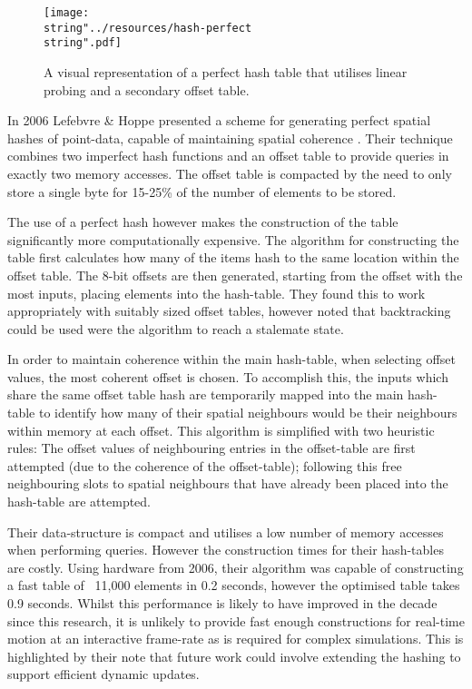 \begin{wrapfigure}{O}{0.6\columnwidth}
  \begin{centering}
    \texttt{[image: \\string"../resources/hash-perfect\\string".pdf]}
  \par\end{centering}
  \protect\caption[A visual representation of a perfect hash table that utilises a secondary offset table.]{\label{fig:hash-perfect}A visual representation of a perfect hash table that utilises linear probing and a secondary offset table.}
\end{wrapfigure}
      In 2006 Lefebvre \& Hoppe presented a scheme for generating perfect spatial hashes of point-data, capable of maintaining spatial \gls{coherence} \cite{LH06}. Their technique combines two imperfect hash functions and an offset table to provide queries in exactly two memory accesses. The offset table is compacted by the need to only store a single byte for 15-25\% of the number of elements to be stored.
      
      The use of a perfect hash however makes the construction of the table significantly more computationally expensive. The algorithm for constructing the table first calculates how many of the items hash to the same location within the offset table. The 8-bit offsets are then generated, starting from the offset with the most inputs, placing elements into the hash-table. They found this to work appropriately with suitably sized offset tables, however noted that backtracking could be used were the algorithm to reach a stalemate state.
      
      In order to maintain \gls{coherence} within the main hash-table, when selecting offset values, the most coherent offset is chosen. To accomplish this, the inputs which share the same offset table hash are temporarily mapped into the main hash-table to identify how many of their spatial neighbours would be their neighbours within memory at each offset. This algorithm is simplified with two heuristic rules: The offset values of neighbouring entries in the offset-table are first attempted (due to the \gls{coherence} of the offset-table); following this free neighbouring slots to spatial neighbours that have already been placed into the hash-table are attempted.
      
      Their data-structure is compact and utilises a low number of memory accesses when performing queries. However the construction times for their hash-tables are costly. Using hardware from 2006, their algorithm was capable of constructing a fast table of ~11,000 elements in 0.2 seconds, however the optimised table takes 0.9 seconds. Whilst this performance is likely to have improved in the decade since this research, it is unlikely to provide fast enough constructions for real-time motion at an interactive frame-rate as is required for complex simulations. This is highlighted by their note that future work could involve extending the hashing to support efficient dynamic updates.
   
